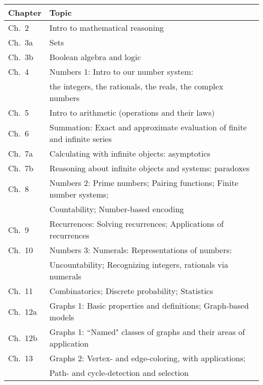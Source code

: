  \bigskip

\noindent
\begin{tabular}{|l|l|}
\hline
 {\bf Chapter} & {\bf Topic} \\
\hline
\hline
Ch.~2    & Intro to mathematical reasoning \\
Ch.~3a  & Sets \\
Ch.~3b  & Boolean algebra and logic \\
Ch.~4  & Numbers 1: Intro to our number system: \\
            & \hspace*{.67in}the integers, the rationals, the reals, the complex numbers \\
Ch.~5  &Intro to arithmetic (operations and their laws) \\
Ch.~6  & Summation: Exact and approximate evaluation of finite and infinite series   \\
Ch.~7a & Calculating with infinite objects: asymptotics \\
Ch.~7b  & Reasoning about infinite objects and systems: paradoxes \\
Ch.~8  & Numbers 2: Prime numbers; Pairing functions; Finite number systems; \\
            & \hspace*{.67in}Countability; Number-based encoding  \\
Ch.~9  & Recurrences: Solving recurrences; Applications of recurrences \\
Ch.~10 & Numbers 3: Numerals: Representations of numbers: \\
             & \hspace*{.67in}Uncountability; Recognizing integers, rationals via numerals \\
Ch.~11  & Combinatorics; Discrete probability; Statistics \\
Ch.~12a & Graphs 1: Basic properties and definitions; Graph-based models \\
Ch.~12b & Graphs 1: ``Named" classes of graphs and their areas of application \\
Ch.~13 & Graphs 2: Vertex- and edge-coloring, with applications; \\
             & \hspace*{.67in}Path- and cycle-detection and selection \\
\hline
\end{tabular}

\bigskip


